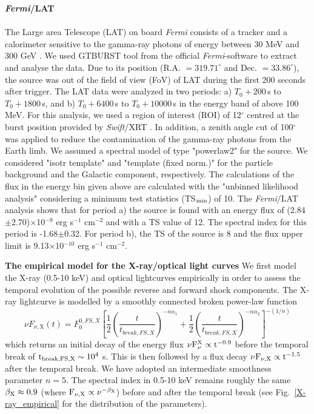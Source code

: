 \documentclass{naturesubmissionstyle}
\begin{document}
{\noindent \bf  {\it Fermi}/LAT} \\
\\
The Large area Telescope (LAT) on board \textit{Fermi} consists of a tracker and a calorimeter sensitive to the gamma-ray photons of energy
between 30 MeV and 300 GeV \cite{2013ApJS..209...11A}. 
We used GTBURST tool from the official \textit{Fermi}-software to extract and analyse the data. 
Due to its position (R.A. $= 319.71^{\circ}$ and Dec. $= 33.86^{\circ}$), the source was out of the field of view (FoV) of LAT during the first 200 seconds after trigger.
The LAT data were analyzed in two periods: a) $T_0 + 200$\,s to $T_0 + 1800$\,s, and b) $T_0 + 6400$\,s to $T_0 + 10000$\,s in the energy band of above 100\,MeV.
For this analysis, we used a region of interest (ROI) of 12$^{\circ}$
centred at the burst position provided by {\it Swift}/XRT \cite{gcn_30270}. 
In addition, a zenith angle cut of 100$^{\circ}$ was applied to reduce the contamination of the gamma-ray photons from the Earth limb. 
We assumed a spectral model of type "powerlaw2" for the source.
We considered "isotr template" and "template (fixed norm.)" %
for the particle background and the Galactic component, respectively.
The calculations of the flux in the energy bin given above are calculated with the "unbinned likelihood analysis" considering a minimum test statistics (TS$_{\rm min}$) of 10.
The \textit{Fermi}/LAT analysis shows that for period a) the source is found with an energy flux of (2.84$\pm$2.70)$\times$10$^{-9}$ erg s$^{-1}$ cm$^{-2}$ and with a TS value of 12. The spectral index for this period is -1.68$\pm$0.32. For period b), the TS of the source is 8 and the flux upper limit is 9.13$\times$10$^{-10}$ erg s$^{-1}$ cm$^{-2}$.

{\noindent \bf The empirical model for the X-ray/optical light curves}
We first model the X-ray (0.5-10 keV) and optical lightcurves  empirically in order to assess the temporal evolution of the
possible reverse and forward shock components. The X-ray lightcurve is modelled by a smoothly connected broken power-law function 
\begin{equation}\label{empiric}
\nu F_{\nu, \text {X}}(t)=F_{0}^{0,FS,X}\left[\frac{1}{2}\left(\frac{t}{t_{break,FS,X}}\right)^{-n \alpha_{1}}+\frac{1}{2}\left(\frac{t}{t_{break,FS,X}}\right)^{-n \alpha_{2}}\right]^{-(1 / n)}
\end{equation}
which returns an initial decay of the energy flux $\rm \nu F_{\nu}^{X} \propto t^{-0.9}$ before the temporal break of $\rm t_{break,FS,X} \sim 10^{4}$ s. This is then followed by a flux decay $\rm \nu F_{\nu,X} \propto t^{-1.5}$ after the temporal break.
We have adopted an intermediate smoothness parameter $n=5$. The spectral index in 0.5-10 keV remains roughly the same $\rm \beta_{X} \approx 0.9$ (where $\rm F_{\nu,X} \propto \nu^{-\beta_{X}}$) before and after the temporal break (see Fig.~\ref{X-ray_empirical} for the distribution of the parameters).
\end{document}
